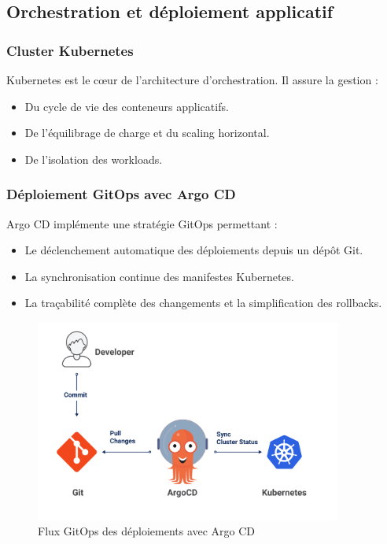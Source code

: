\subsection{Orchestration et déploiement applicatif}

\subsubsection*{Cluster Kubernetes}

Kubernetes est le cœur de l’architecture d’orchestration. Il assure la gestion :
\begin{itemize}
	\item Du cycle de vie des conteneurs applicatifs.
	\item De l’équilibrage de charge et du scaling horizontal.
	\item De l’isolation des workloads.
\end{itemize}

\subsubsection*{Déploiement GitOps avec Argo CD}

Argo CD implémente une stratégie GitOps permettant :
\begin{itemize}
	\item Le déclenchement automatique des déploiements depuis un dépôt Git.
	\item La synchronisation continue des manifestes Kubernetes.
	\item La traçabilité complète des changements et la simplification des rollbacks.
\end{itemize}

\begin{figure}[H]
	\centering
	\includegraphics[width=0.9\textwidth]{figures/gitops-argo-cd.png}
	\caption{Flux GitOps des déploiements avec Argo CD}
\end{figure}

